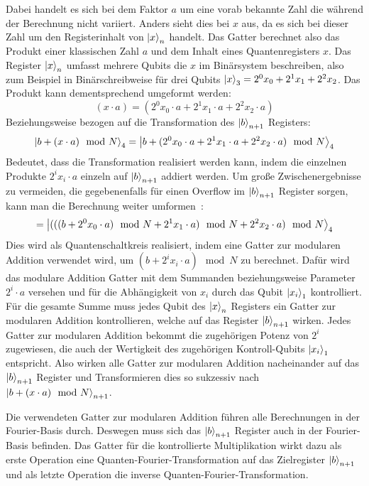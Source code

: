 Dabei handelt es sich bei dem Faktor \(a\) um eine vorab bekannte Zahl die während der Berechnung nicht variiert.
Anders sieht dies bei \(x\) aus, da es sich bei dieser Zahl um den Registerinhalt von \(\ket{x}_{n}\) handelt.
Das Gatter berechnet also das Produkt einer klassischen Zahl \(a\) und dem Inhalt eines Quantenregisters \(x\).
Das Register \(\ket{x}_{n}\) umfasst mehrere Qubits die \(x\) im Binärsystem beschreiben, 
also zum Beispiel in Binärschreibweise für drei Qubits \(\ket{x}_{3} = 2^0x_0+2^1x_1+2^2x_2\).
Das Produkt kann dementsprechend umgeformt werden: 
\[(x\cdot a)  = (2^0x_0\cdot a+2^1x_1\cdot a+2^2x_2\cdot a) \]
Beziehungsweise bezogen auf die Transformation des \(\ket{b}_{n+1}\) Registers:
\[\ket{b + (x\cdot a) \mod N}_{4} = \ket{b + (2^0x_0\cdot a+2^1x_1\cdot a+2^2x_2\cdot a) \mod N}_{4}\]
Bedeutet, dass die Transformation realisiert werden kann, 
indem die einzelnen Produkte \(2^ix_i\cdot a\) einzeln auf \(\ket{b}_{n+1}\) addiert werden.
Um große Zwischenergebnisse zu vermeiden, die gegebenenfalls für einen Overflow im \(\ket{b}_{n+1}\) Register sorgen, 
kann man die Berechnung weiter umformen~\cite{beauregard2003circuit}:
\[= \ket{(((b + 2^0x_0\cdot a)\mod N+2^1x_1\cdot a)\mod N+2^2x_2\cdot a) \mod N}_{4}\]
Dies wird als Quantenschaltkreis realisiert, 
indem eine Gatter zur modularen Addition verwendet wird, 
um \((b + 2^ix_i\cdot a)\mod N\) zu berechnet.
Dafür wird das modulare Addition Gatter mit dem Summanden beziehungsweise Parameter \(2^i\cdot a\) versehen 
und für die Abhängigkeit von \(x_i\) durch das Qubit \(\ket{x_i}_1\) kontrolliert.
Für die gesamte Summe muss jedes Qubit des \(\ket{x}_{n}\) Registers ein Gatter zur modularen Addition kontrollieren, 
welche auf das Register \(\ket{b}_{n+1}\) wirken.
Jedes Gatter zur modularen Addition bekommt die zugehörigen Potenz von \(2^i\) zugewiesen, 
die auch der Wertigkeit des zugehörigen Kontroll-Qubits \(\ket{x_i}_1\) entspricht.
Also wirken alle Gatter zur modularen Addition nacheinander auf das \(\ket{b}_{n+1}\) Register und 
Transformieren dies so sukzessiv nach \(\ket{b + (x\cdot a) \mod N}_{n+1}\).

Die verwendeten Gatter zur modularen Addition führen alle Berechnungen in der Fourier-Basis durch.
Deswegen muss sich das \(\ket{b}_{n+1}\) Register auch in der Fourier-Basis befinden.
Das Gatter für die kontrollierte Multiplikation wirkt dazu als erste Operation eine Quanten-Fourier-Transformation auf 
das Zielregister \(\ket{b}_{n+1}\) und als letzte Operation die inverse Quanten-Fourier-Transformation.

